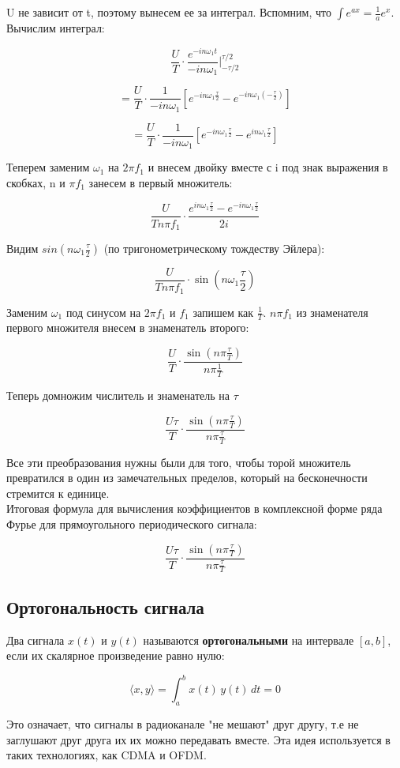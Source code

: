 U не зависит от t, поэтому вынесем ее за интеграл. Вспомним, что $\int e^{ax} = \frac{1}{a}e^x$. Вычислим интеграл:

\[
\frac{U}{T} \cdot \frac{e^{-i n \omega_1 t}}{-i n \omega_1} \Bigg|_{-\tau/2}^{\tau/2}
\]

\[
= \frac{U}{T} \cdot \frac{1}{-i n \omega_1}
\left[
e^{-i n \omega_1 \tfrac{\tau}{2}} - e^{-i n \omega_1 \left(-\tfrac{\tau}{2}\right)}
\right]
\]

\[
= \frac{U}{T} \cdot \frac{1}{-i n \omega_1}
\left[
e^{-i n \omega_1 \tfrac{\tau}{2}} - e^{i n \omega_1 \tfrac{\tau}{2}}
\right]
\]

Теперем заменим $\omega_1$ на $2\pi f_1$ и внесем двойку вместе с i под знак выражения в скобках, n и $\pi f_1$ занесем в первый множитель:

\[
\frac{U}{Tn\pi f_1} \cdot \frac{e^{i n \omega_1 \tfrac{\tau}{2}} - e^{-i n \omega_1 \tfrac{\tau}{2}}}{2i}
\]

Видим $sin(n\omega_1\frac{\tau}{2})$ (по тригонометрическому тождеству Эйлера):

\[
\frac{U}{Tn \pi f_1} \cdot \sin\!\left(n \omega_1 \frac{\tau}{2}\right)
\]

Заменим $\omega_1$ под синусом на $2\pi f_1$ и $f_1$ запишем как $\frac{1}{T}$. $n \pi f_1$ из знаменателя первого множителя внесем в знаменатель второго:

\[
\frac{U}{T} \cdot \frac{\sin\!\left(n \pi \frac{\tau}{T}\right)}{n \pi \frac{1}{T}}
\]

Теперь домножим числитель и знаменатель на $\tau$

\[
\frac{U \tau}{T} \cdot \frac{\sin\!\left(n \pi \frac{\tau}{T}\right)}{n \pi \frac{\tau}{T}}
\]

Все эти преобразования нужны были для того, чтобы торой множитель превратился в один из замечательных пределов, который  на бесконечности стремится к единице. \\

Итоговая формула для вычисления коэффициентов в комплексной форме ряда Фурье для прямоугольного периодического сигнала:

\[
\boxed{\frac{U \tau}{T} \cdot \frac{\sin\!\left(n \pi \frac{\tau}{T}\right)}{n \pi \frac{\tau}{T}}}
\]

\subsection*{\textbf{Ортогональность сигнала}}

Два сигнала \(x(t)\) и \(y(t)\) называются \textbf{ортогональными} на интервале \([a, b]\), если их скалярное произведение равно нулю:

\[
\langle x, y \rangle = \int_{a}^{b} x(t) \, y(t) \, dt = 0
\]

Это означает, что сигналы в радиоканале "не мешают" друг другу, т.е не заглушают друг друга их их можно передавать вместе. Эта идея используется в таких
технологиях, как CDMA и OFDM.
\endinput